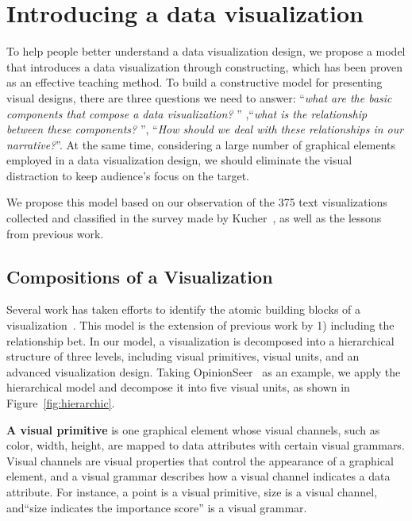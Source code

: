 \section{Introducing a data visualization} \label{analysis}

To help people better understand a data visualization design, we propose a model that introduces a data visualization through constructing, which has been proven as an effective teaching method\cite{huron_constructive_2014, chapman_constructive_1988}. To build a constructive model for presenting visual designs, there are three questions we need to answer: ``\textit{what are the basic components that compose a data visualization? }'' ,``\textit{what is the relationship between these components? }'', ``\textit{How should we deal with these relationships in our narrative?}''. At the same time, considering a large number of graphical elements employed in a data visualization design, we should eliminate the visual distraction to keep audience's focus on the target.

We propose this model based on our observation of the 375 text visualizations collected and classified in the survey made by Kucher~\cite{kucher2015text}, as well as the lessons from previous work. 

\subsection{Compositions of a Visualization}\label{compositions}
Several work has taken efforts to identify the atomic building blocks of a visualization~\cite{mendez_ivolver:_2016, bertin1983semiology}. 
This model is the extension of previous work by 1) including the relationship bet. 
In our model, a visualization is decomposed into a hierarchical structure of three levels, including
visual primitives, visual units, and an advanced visualization design. 
Taking OpinionSeer~\cite{wu_opinionseer:_2010} as an example, we apply the hierarchical model and decompose it into five visual units, as shown in Figure~\ref{fig:hierarchic}. 

\textbf{A visual primitive} is one graphical element whose visual channels, such as color, width, height, are mapped to data attributes with certain visual grammars. Visual channels are visual properties that control the appearance of a graphical element, and a visual grammar describes how a visual channel indicates a data attribute. For instance, a point is a visual primitive, size is a visual channel, and``size indicates the importance score'' is a visual grammar. 

